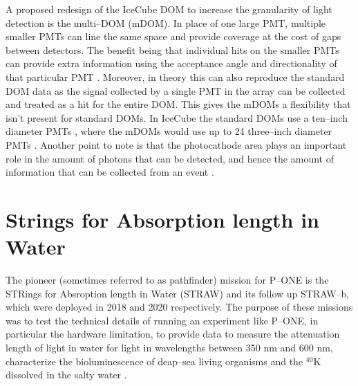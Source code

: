 A proposed redesign of the IceCube DOM to increase the granularity of light detection is the multi--DOM (mDOM). In place of one large PMT, multiple smaller PMTs can line the same space and provide coverage at the cost of gaps between detectors. The benefit being that individual hits on the smaller PMTs can provide extra information using the acceptance angle and directionality of that particular PMT \cite{mpmt}. Moreover, in theory this can also reproduce the standard DOM data as the signal collected by a single PMT in the array can be collected and treated as a hit for the entire DOM. This gives the mDOMs a flexibility that isn't present for standard DOMs. In IceCube the standard DOMs use a ten--inch diameter PMTs \cite{icecube}, where the mDOMs would use up to 24 three--inch diameter PMTs \cite{mpmt}. Another point to note is that the photocathode area plays an important role in the amount of photons that can be detected, and hence the amount of information that can be collected from an event \cite{icecube}. 

\section{Strings for Absorption length in Water}

The pioneer (sometimes referred to as pathfinder) mission for P--ONE is the STRings for Absroption length in Water (STRAW) and its follow up STRAW--b, which were deployed in 2018 and 2020 respectively. The purpose of these missions was to test the technical details of running an experiment like P--ONE, in particular the hardware limitation, to provide data to measure the attenuation length of light in water for light in wavelengths between 350 nm and 600 nm, characterize the bioluminescence of deap--sea living organisms and the $^{40}$K dissolved in the salty water \cite{straw}.

